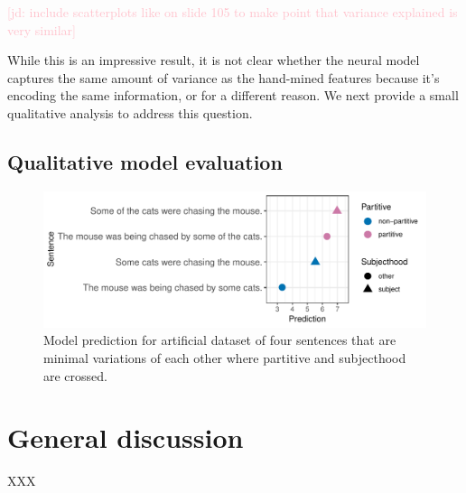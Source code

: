 \documentclass[10pt,letterpaper]{article}
\newcommand{\jd}[1]{\textcolor{Pink}{[jd: #1]}}
\begin{document}
\jd{include scatterplots like on slide 105 to make point that variance explained is very similar}

While this is an impressive result, it is not clear whether the neural model captures the same amount of variance as the hand-mined features because it's encoding the same information, or for a different reason. We next provide a small qualitative analysis to address this question.

\subsection{Qualitative model evaluation}


\begin{figure}
	\includegraphics[width=.5\textwidth]{../models/graphs/qualitative_prediction_means_partsubj}
	\caption{Model prediction for artificial dataset of four sentences that are minimal variations of each other where partitive and subjecthood are crossed.}
	\label{fig:modelqualitative}
\end{figure}

\section{General discussion}

XXX



\setlength{\bibleftmargin}{.125in}
\setlength{\bibindent}{-\bibleftmargin}
\end{document}
